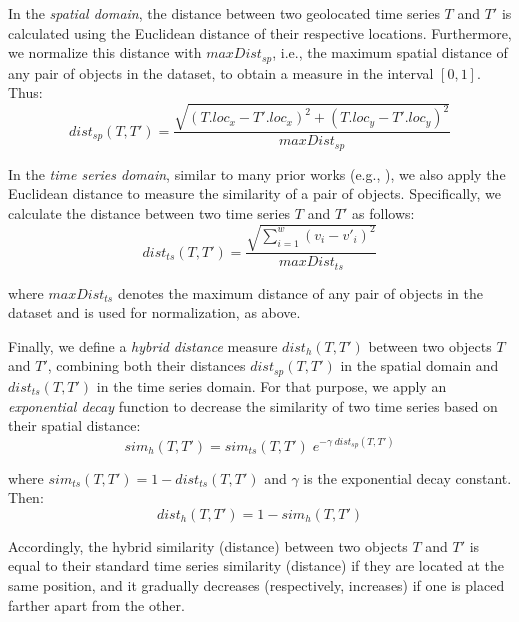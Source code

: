 In the {\em spatial domain}, the distance between two geolocated time series $T$ and $T'$ is calculated using the Euclidean distance of their respective locations. Furthermore, we normalize this distance with $maxDist_{sp}$, i.e., the maximum spatial distance of any pair of objects in the dataset, to obtain a measure in the interval $[0,1]$. Thus:
\begin{equation} \label{eq:dist_sp}
 dist_{sp}(T, T') = \frac{\sqrt{(T.loc_x - T'.loc_x)^2 + (T.loc_y - T'.loc_y)^2}}{maxDist_{sp}}
\end{equation} \label{eq:2}

In the {\em time series domain}, similar to many prior works (e.g., \cite{shieh2008kdd}), we also apply the Euclidean distance to measure the similarity of a pair of objects. Specifically, we calculate the distance between two time series $T$ and $T'$ as follows:
\begin{equation} \label{eq:dist_ts}
 dist_{ts}(T, T') = \frac{\sqrt{\displaystyle \sum_{i=1}^{w}(v_i - v'_i)^2}}{maxDist_{ts}}
\end{equation}

\noindent where $maxDist_{ts}$ denotes the maximum distance of any pair of objects in the dataset and is used for normalization, as above.

Finally, we define a {\em hybrid distance} measure $dist_h(T, T')$ between two objects $T$ and $T'$, combining both their distances $dist_{sp}(T, T')$ in the spatial domain and $dist_{ts}(T, T')$ in the time series domain. For that purpose, we apply an {\em exponential decay} function to decrease the similarity of two time series based on their spatial distance:
\begin{equation}
 sim_h(T, T') = sim_{ts}(T, T') \; e^{- \gamma \; dist_{sp}(T, T')}
 \label{eq:sim_h}
\end{equation}

\noindent where $sim_{ts}(T, T') = 1 - dist_{ts}(T, T')$ and $\gamma$ is the exponential decay constant. Then:
\begin{equation}
 dist_h(T, T') = 1 - sim_h(T, T')
 \label{eq:dist_h}
\end{equation}

Accordingly, the hybrid similarity (distance) between two objects $T$ and $T'$ is equal to their standard time series similarity (distance) if they are located at the same position, and it gradually decreases (respectively, increases) if one is placed farther apart from the other.




